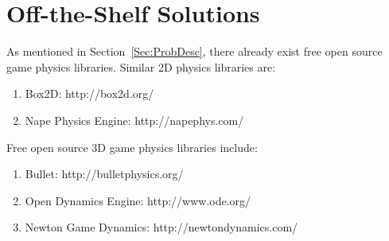 \documentclass[12pt]{article}
\begin{document}
\section{Off-the-Shelf Solutions}
\label{Sec:Off-Solu}
As mentioned in Section~\ref{Sec:ProbDesc}, there already exist free open source game physics libraries. Similar 2D physics libraries are:
\begin{enumerate}
\item{Box2D: http://box2d.org/}
\item{Nape Physics Engine: http://napephys.com/}
\end{enumerate}
Free open source 3D game physics libraries include:
\begin{enumerate}
\item{Bullet: http://bulletphysics.org/}
\item{Open Dynamics Engine: http://www.ode.org/}
\item{Newton Game Dynamics: http://newtondynamics.com/}
\end{enumerate}
\end{document}
